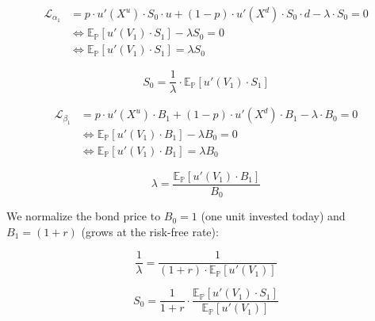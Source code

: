 \documentclass[hidelinks, 12pt, a4paper]{article}
\theoremstyle{definition}
\begin{document}
\begin{equation}
\begin{aligned}
\mathcal{L}_{\alpha_1}
  &= p \cdot u'(X^u) \cdot S_0 \cdot u 
     + (1-p) \cdot u'(X^d) \cdot S_0 \cdot d
     - \lambda \cdot S_0 = 0 \\[4pt]
  &\Longleftrightarrow 
  \mathbb{E}_{\mathbb{P}}\left[u'(V_1) \cdot S_1\right] 
  - \lambda S_0 = 0 \\[4pt]
  &\Longleftrightarrow
  \mathbb{E}_{\mathbb{P}}\left[u'(V_1) \cdot S_1\right] = \lambda S_0
\end{aligned}
\end{equation}


\begin{equation}
S_0 = \frac{1}{\lambda} \cdot 
\mathbb{E}_{\mathbb{P}}\left[u'(V_1) \cdot S_1\right]
\tag{I}
\end{equation}


\begin{equation}
\begin{aligned}
\mathcal{L}_{\beta_1}
  &= p \cdot u'(X^u) \cdot B_1 
     + (1-p) \cdot u'(X^d) \cdot B_1
     - \lambda \cdot B_0 = 0 \\[4pt]
  &\Longleftrightarrow
  \mathbb{E}_{\mathbb{P}}\left[u'(V_1) \cdot B_1\right]
  - \lambda B_0 = 0 \\[4pt]
  &\Longleftrightarrow
  \mathbb{E}_{\mathbb{P}}\left[u'(V_1) \cdot B_1\right] = \lambda B_0
\end{aligned}
\end{equation}


\begin{equation}
\lambda = 
\frac{\mathbb{E}_{\mathbb{P}}\left[u'(V_1) \cdot B_1\right]}{B_0}
\tag{II}
\end{equation}

\noindent We normalize the bond price to $B_0 = 1$ (one unit invested today) 
and $B_1 = (1+r)$ (grows at the risk-free rate):

\begin{equation}
\frac{1}{\lambda}
  = \frac{1}{(1+r) \cdot \mathbb{E}_{\mathbb{P}}\left[u'(V_1)\right]}
\end{equation}



\begin{equation}
S_0
  = \frac{1}{1+r} \cdot 
  \frac{\mathbb{E}_{\mathbb{P}}\left[u'(V_1) \cdot S_1\right]}
       {\mathbb{E}_{\mathbb{P}}\left[u'(V_1)\right]}
\tag{III}
\end{equation}
\end{document}
